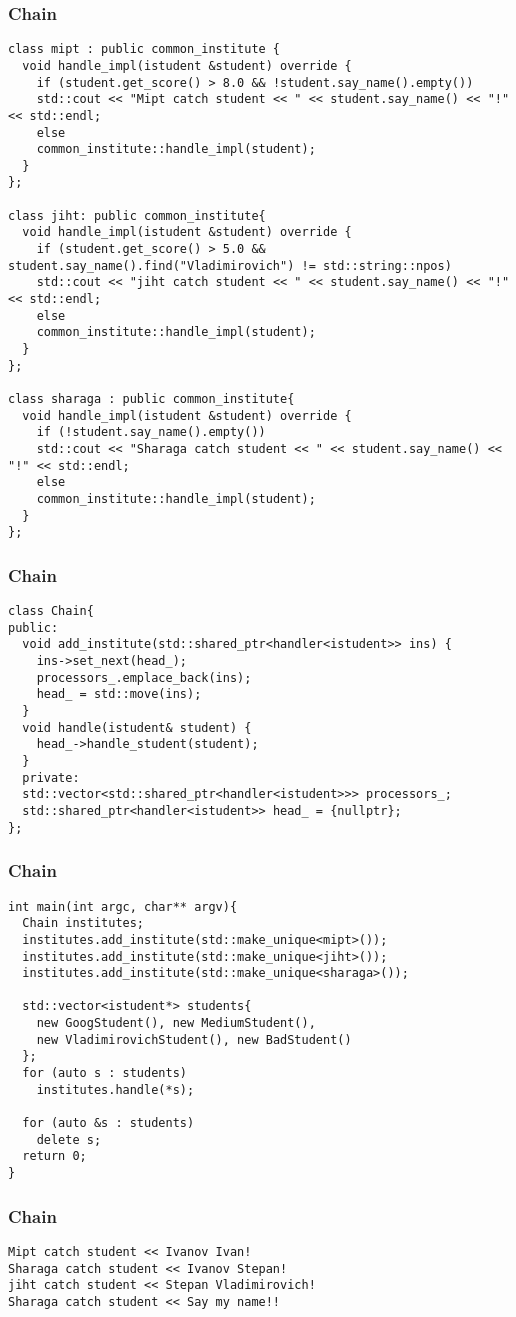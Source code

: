 \begin{frame}[fragile]
  \frametitle{Chain}
  \begin{verbatim}
class mipt : public common_institute {
  void handle_impl(istudent &student) override {
    if (student.get_score() > 8.0 && !student.say_name().empty())
    std::cout << "Mipt catch student << " << student.say_name() << "!" << std::endl;
    else
    common_institute::handle_impl(student);
  }
};

class jiht: public common_institute{
  void handle_impl(istudent &student) override {
    if (student.get_score() > 5.0 && student.say_name().find("Vladimirovich") != std::string::npos)
    std::cout << "jiht catch student << " << student.say_name() << "!" << std::endl;
    else
    common_institute::handle_impl(student);
  }
};

class sharaga : public common_institute{
  void handle_impl(istudent &student) override {
    if (!student.say_name().empty())
    std::cout << "Sharaga catch student << " << student.say_name() << "!" << std::endl;
    else
    common_institute::handle_impl(student);
  }
};
  \end{verbatim}
\end{frame}

\begin{frame}[fragile]
  \frametitle{Chain}
  \begin{verbatim}
class Chain{
public:
  void add_institute(std::shared_ptr<handler<istudent>> ins) {
    ins->set_next(head_);
    processors_.emplace_back(ins);
    head_ = std::move(ins);
  }
  void handle(istudent& student) { 
    head_->handle_student(student); 
  }
  private:
  std::vector<std::shared_ptr<handler<istudent>>> processors_;
  std::shared_ptr<handler<istudent>> head_ = {nullptr};
};
  \end{verbatim}
\end{frame}

\begin{frame}[fragile]
  \frametitle{Chain}
  \begin{verbatim}
int main(int argc, char** argv){
  Chain institutes;
  institutes.add_institute(std::make_unique<mipt>());
  institutes.add_institute(std::make_unique<jiht>());
  institutes.add_institute(std::make_unique<sharaga>());
  
  std::vector<istudent*> students{
    new GoogStudent(), new MediumStudent(), 
    new VladimirovichStudent(), new BadStudent()
  };
  for (auto s : students)
    institutes.handle(*s);
  
  for (auto &s : students)
    delete s;
  return 0;
}
  \end{verbatim}
\end{frame}

\begin{frame}[fragile]
  \frametitle{Chain}
  \begin{verbatim}
Mipt catch student << Ivanov Ivan!
Sharaga catch student << Ivanov Stepan!
jiht catch student << Stepan Vladimirovich!
Sharaga catch student << Say my name!!
  \end{verbatim}
\end{frame}